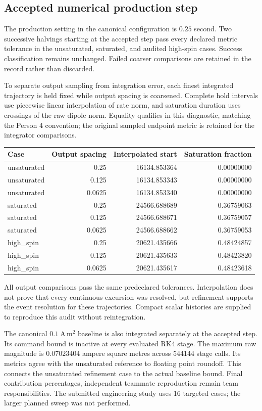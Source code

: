 \subsection{Accepted numerical production step}
The production setting in the canonical configuration is
$0.25$ second.
Two successive halvings starting at the accepted step pass every declared
metric tolerance in the unsaturated, saturated, and audited high-spin cases.
Success classification remains unchanged. Failed coarser comparisons are
retained in the record rather than discarded.

To separate output sampling from integration error, each finest integrated
trajectory is held fixed while output spacing is coarsened. Complete hold
intervals use piecewise linear interpolation of rate norm, and saturation
duration uses crossings of the raw dipole norm. Equality qualifies in this
diagnostic, matching the Person 4 convention; the original sampled endpoint
metric is retained for the integrator comparisons.
\begin{center}
\begin{tabular}{lrrr}
Case & Output spacing & Interpolated start & Saturation fraction \\
\hline
unsaturated & 0.25 & 16134.853364 & 0.00000000 \\
unsaturated & 0.125 & 16134.853343 & 0.00000000 \\
unsaturated & 0.0625 & 16134.853340 & 0.00000000 \\
saturated & 0.25 & 24566.688689 & 0.36759063 \\
saturated & 0.125 & 24566.688671 & 0.36759057 \\
saturated & 0.0625 & 24566.688662 & 0.36759053 \\
high\_spin & 0.25 & 20621.435666 & 0.48424857 \\
high\_spin & 0.125 & 20621.435633 & 0.48423820 \\
high\_spin & 0.0625 & 20621.435617 & 0.48423618 \\
\end{tabular}
\end{center}
All output comparisons pass the same predeclared tolerances. Interpolation
does not prove that every continuous excursion was resolved, but refinement
supports the event resolution for these trajectories. Compact scalar
histories are supplied to reproduce this audit without reintegration.

The canonical $0.1\ \mathrm{A\,m^2}$ baseline is also integrated separately
at the accepted step. Its command bound is inactive at every evaluated RK4
stage. The maximum raw magnitude is
$0.07023404$ ampere square metres across 544144 stage calls.
Its metrics agree with the unsaturated reference to floating point
roundoff. This connects the unsaturated refinement case to the actual
baseline bound. Final contribution percentages, independent teammate
reproduction remain team responsibilities. The submitted engineering study
uses 16 targeted cases; the larger planned sweep was not performed.

